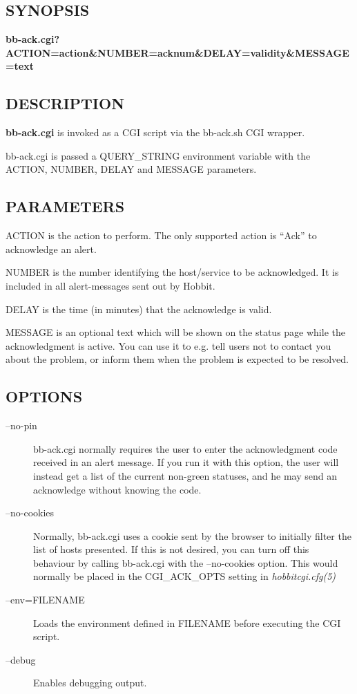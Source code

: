 \subsection{SYNOPSIS}
\textbf{bb-ack.cgi?ACTION=action\&NUMBER=acknum\&DELAY=validity\&MESSAGE=text}


 
\subsection{DESCRIPTION}
\textbf{bb-ack.cgi}
 is invoked as a CGI script via the bb-ack.sh CGI wrapper. 

  bb-ack.cgi is passed a QUERY\_STRING environment variable with the
  ACTION, NUMBER, DELAY and MESSAGE parameters. 



 
\subsection{PARAMETERS}
 ACTION is the action to perform. The only supported action is ``Ack'' to acknowledge an alert. 

  NUMBER is the number identifying the host/service to be
  acknowledged. It is included in all alert-messages sent out by
  Hobbit. 



  DELAY is the time (in minutes) that the acknowledge is valid. 


  MESSAGE is an optional text which will be shown on the status page
  while the acknowledgment is active. You can use it to e.g. tell
  users not to contact you about the problem, or inform them when the
  problem is expected to be resolved. 



 
\subsection{OPTIONS}
\begin{description}
\item[--no-pin] bb-ack.cgi normally requires the user to enter the
  acknowledgment code received in an alert message. If you run it with
  this option, the user will instead get a list of the current
  non-green statuses, and he may send an acknowledge without knowing
  the code. 


 

\item[--no-cookies] Normally, bb-ack.cgi uses a cookie sent by the
  browser to initially filter the list of hosts presented. If this is
  not desired, you can turn off this behaviour by calling bb-ack.cgi
  with the --no-cookies option. This would normally be placed in the
  CGI\_ACK\_OPTS setting in \emph{hobbitcgi.cfg(5)}



 
\item[--env=FILENAME] Loads the environment defined in FILENAME before executing the CGI script. 

 

\item[--debug] Enables debugging output. 

 


\end{description}
